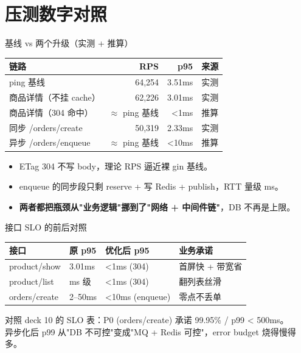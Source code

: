 \section{压测数字对照}

\begin{frame}{基线 vs 两个升级（实测 + 推算）}
\begin{tabular}{@{}lrrr@{}}
\toprule
链路 & RPS & p95 & 来源 \\
\midrule
ping 基线              & 64{,}254 & 3.51ms & 实测 \\
商品详情（不挂 cache） & 62{,}226 & 3.01ms & 实测 \\
商品详情（304 命中）   & $\approx$ ping 基线 & <1ms & 推算 \\
\midrule
同步 /orders/create   & 50{,}319 & 2.33ms & 实测 \\
异步 /orders/enqueue  & $\approx$ ping 基线 & <10ms & 推算 \\
\bottomrule
\end{tabular}
\vspace{2mm}
\begin{itemize}
  \item ETag 304 不写 body，理论 RPS 逼近裸 gin 基线。
  \item enqueue 的同步段只剩 reserve + 写 Redis + publish，RTT 量级 ms。
  \item \textbf{两者都把瓶颈从"业务逻辑"挪到了"网络 + 中间件链"}，DB 不再是上限。
\end{itemize}
\end{frame}

\begin{frame}{接口 SLO 的前后对照}
\begin{tabular}{@{}llll@{}}
\toprule
接口 & 原 p95 & 优化后 p95 & 业务承诺 \\
\midrule
product/show   & 3.01ms & <1ms (304)   & 首屏快 + 带宽省 \\
product/list   & ms 级  & <1ms (304)   & 翻列表丝滑 \\
orders/create  & 2--50ms & <10ms (enqueue) & 零点不丢单 \\
\bottomrule
\end{tabular}
\vspace{3mm}
\small 对照 deck 10 的 SLO 表：P0 (orders/create) 承诺 99.95\% / p99 < 500ms。\\
异步化后 p99 从"DB 不可控"变成"MQ + Redis 可控"，error budget 烧得慢得多。
\end{frame}

